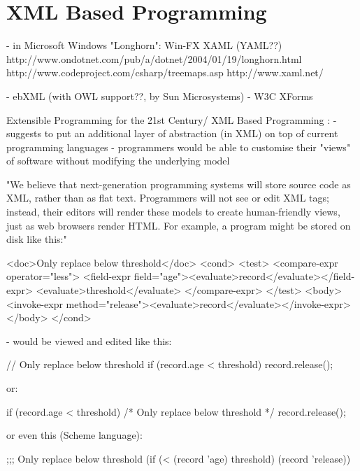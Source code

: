 %
%
%
%
%
%
%

\section{XML Based Programming}
\label{xml_based_programming_heading}




- in Microsoft Windows "Longhorn": Win-FX XAML (YAML??)
http://www.ondotnet.com/pub/a/dotnet/2004/01/19/longhorn.html
http://www.codeproject.com/csharp/treemaps.asp
\cite{xaml}
http://www.xaml.net/

- ebXML (with OWL support??, by Sun Microsystems)
- W3C XForms

Extensible Programming for the 21st Century/ XML Based Programming \cite{wilson}:
- suggests to put an additional layer of abstraction (in XML) on top of current
programming languages
- programmers would be able to customise their "views" of software without
modifying the underlying model

"We believe that next-generation programming systems will store source code as XML,
rather than as flat text. Programmers will not see or edit XML tags; instead, their
editors will render these models to create human-friendly views, just as web browsers
render HTML. For example, a program might be stored on disk like this:"

<doc>Only replace below threshold</doc>
<cond>
  <test>
    <compare-expr operator="less">
      <field-expr field="age"><evaluate>record</evaluate></field-expr>
      <evaluate>threshold</evaluate>
    </compare-expr>
  </test>
  <body>
    <invoke-expr method="release"><evaluate>record</evaluate></invoke-expr>
  </body>
</cond>

- would be viewed and edited like this:

// Only replace below threshold
if (record.age < threshold) {
    record.release();
}

or:

if (record.age < threshold)    /* Only replace below threshold */
{
        record.release();
}

or even this (Scheme language):

;;; Only replace below threshold
(if (< (record 'age) threshold)
    (record 'release))
